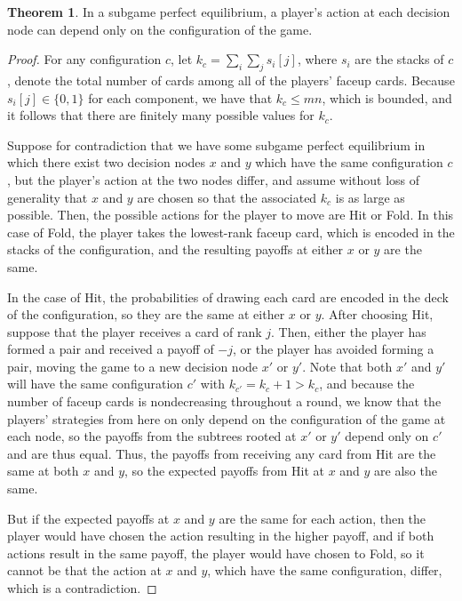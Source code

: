 \documentclass{article}
\theoremstyle{definition}
\newcounter{a}
\newtheorem{theorem}[a]{Theorem}
\begin{document}
\begin{theorem}
In a subgame perfect equilibrium, a player's action at each decision node can depend only on the configuration of the game.
\begin{proof}
For any configuration $c$, let $k_c = \sum_i \sum_j s_i [j]$, where $s_i$ are the stacks of $c$, denote the total number of cards among all of the players' faceup cards. Because $s_i [j] \in \{0,1\}$ for each component, we have that $k_c \le mn$, which is bounded, and it follows that there are finitely many possible values for $k_c$.

Suppose for contradiction that we have some subgame perfect equilibrium in which there exist two decision nodes $x$ and $y$ which have the same configuration $c$, but the player's action at the two nodes differ, and assume without loss of generality that $x$ and $y$ are chosen so that the associated $k_c$ is as large as possible. Then, the possible actions for the player to move are Hit or Fold. In this case of Fold, the player takes the lowest-rank faceup card, which is encoded in the stacks of the configuration, and the resulting payoffs at either $x$ or $y$ are the same. 

In the case of Hit, the probabilities of drawing each card are encoded in the deck of the configuration, so they are the same at either $x$ or $y$. After choosing Hit, suppose that the player receives a card of rank $j$. Then, either the player has formed a pair and received a payoff of $-j$, or the player has avoided forming a pair, moving the game to a new decision node $x'$ or $y'$. Note that both $x'$ and $y'$ will have the same configuration $c'$ with $k_{c'} = k_c  + 1 >  k_c$, and because the number of faceup cards is nondecreasing throughout a round, we know that the players' strategies from here on only depend on the configuration of the game at each node, so the payoffs from the subtrees rooted at $x'$ or $y'$ depend only on $c'$ and are thus equal. Thus, the payoffs from receiving any card from Hit are the same at both $x$ and $y$, so the expected payoffs from Hit at $x$ and $y$ are also the same.

But if the expected payoffs at $x$ and $y$ are the same for each action, then the player would have chosen the action resulting in the higher payoff, and if both actions result in the same payoff, the player would have chosen to Fold, so it cannot be that the action at $x$ and $y$, which have the same configuration, differ, which is a contradiction.
\end{proof}
\label{proof:2playermarkov}
\end{theorem}
\end{document}

